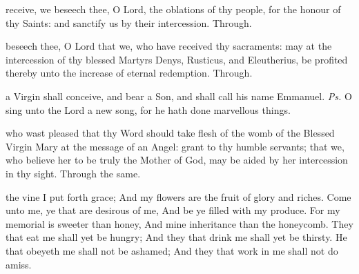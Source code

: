 
\secret
{} receive, we beseech thee, O Lord, the oblations of thy people, for the honour of thy Saints: and sanctify us by their intercession. Through.\\


\postcommunion
{} beseech thee, O Lord that we, who have received thy sacraments: may at the intercession of thy blessed Martyrs Denys, Rusticus, and Eleutherius, be profited thereby unto the increase of eternal redemption. Through.



\introit
{} a Virgin shall conceive, and bear a Son, and shall call his name Emmanuel. \textit{Ps.} O sing unto the Lord a new song, for he hath done marvellous things.

\collect
{} who wast pleased that thy Word should take flesh of the womb of the Blessed Virgin Mary at the message of an Angel: grant to thy humble servants; that we, who believe her to be truly the Mother of God, may be aided by her intercession in thy sight. Through the same.

 the vine I put forth grace; And my flowers are the fruit of glory and riches. Come unto me, ye that are desirous of me, And be ye filled with my produce. For my memorial is sweeter than honey, And mine inheritance than the honeycomb. They that eat me shall yet be hungry; And they that drink me shall yet be thirsty. He that obeyeth me shall not be ashamed; And they that work in me shall not do amiss. 


